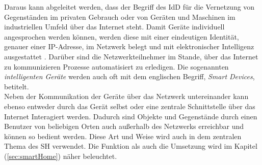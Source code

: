    Daraus kann abgeleitet werden, dass der Begriff des \acl{IdD} für die Vernetzung von Gegenständen im privaten Gebrauch oder 
    von Geräten und Maschinen im industriellen Umfeld über das Internet steht. Damit Geräte individuell angesprochen werden können, werden diese 
    mit einer eindeutigen Identität, genauer einer \ac{IP}-Adresse, im Netzwerk belegt und mit elektronischer Intelligenz ausgestattet \cite{bigdatainsider2016}.
    Darüber sind die Netzwerkteilnehmer im Stande, über das Internet zu kommunizieren Prozesse automatisiert zu erledigen. Die sogenannten 
    \textit{intelligenten Geräte} werden auch oft mit dem englischen Begriff, \textit{Smart Devices}, betitelt. 
    \\
    \linebreak
    Neben der Kommunikation der Geräte über das Netzwerk untereinander kann ebenso entweder durch das Gerät selbst oder eine zentrale 
    Schnittstelle über das Internet Interagiert werden. Dadurch sind Objekte und Gegenstände durch einen Benutzer von beliebigen Orten 
    auch außerhalb des Netzwerks erreichbar und können so bedient werden. Diese Art und Weise wird auch in dem zentralen Thema des 
    \acl{SH} verwendet. Die Funktion als auch die Umsetzung wird im Kapitel (\ref{sec:smartHome}) näher beleuchtet.

